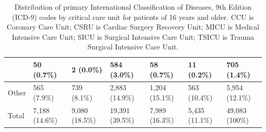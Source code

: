\documentclass[english]{article}
\begin{document}
\begin{center}
\begin{table}
\begin{tabular}{|p{4.0cm}|p{1.25cm}|p{1.25cm}|p{1.25cm}|p{1.25cm}|p{1.25cm}|p{1.25cm}|}
    & 50 (0.7\%) & 2 (0.0\%) & 584 (3.0\%) & 58 (0.7\%) & 11 (0.2\%) & 705 (1.4\%) \\ 
    \hline
    Other & 565 (7.9\%) & 739 (8.1\%) & 2,883 (14.9\%) & 1,204 (15.1\%) & 563 (10.4\%) & 5,954 (12.1\%) \\ 
    \hline
    Total & 7,188 (14.6\%) & 9,080 (18.5\%) & 19,391 (39.5\%) & 7,989 (16.3\%) & 5,435 (11.1\%) & 49,083 (100\%) \\ 
    \hline
\end{tabular}
\caption{Distribution of primary International Classification of Diseases, 9th Edition (ICD-9) codes by critical care unit for patients of 16 years and older. CCU is Coronary Care Unit; CSRU is Cardiac Surgery Recovery Unit; MICU is Medical Intensive Care Unit; SICU is Surgical Intensive Care Unit; TSICU is Trauma Surgical Intensive Care Unit.}
\label{table:icddistribution}
\end{table}
\end{center}

\end{document}
